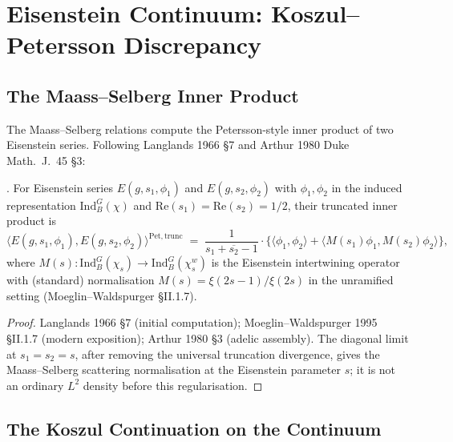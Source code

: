 \section{Eisenstein Continuum: Koszul--Petersson Discrepancy}
\label{v4-arith:kms-gns:cycle4}

\subsection{The Maass--Selberg Inner Product}
\label{v4-arith:kms-gns:cycle4:maass-selberg}

The Maass--Selberg relations compute the Petersson-style inner
product of two Eisenstein series. Following Langlands 1966 \S7 and
Arthur 1980 Duke Math.~J.~45 \S3:

\begin{lemma}
\label{v4-arith:kms-gns:lem:maass-selberg}
\ClaimStatusProvedElsewhere. For Eisenstein series
\(E(g,s_{1},\phi_{1})\) and \(E(g,s_{2},\phi_{2})\) with
\(\phi_{1},\phi_{2}\) in the induced representation
\(\mathrm{Ind}_{B}^{G}(\chi)\) and \(\mathrm{Re}(s_{1})=\mathrm{Re}(s_{2})=1/2\),
their truncated inner product is
\begin{equation}
\label{v4-arith:kms-gns:eq:maass-selberg}
\bigl\langle E(g,s_{1},\phi_{1}),E(g,s_{2},\phi_{2})\bigr\rangle^{\mathrm{Pet},\mathrm{trunc}}\;=\;\frac{1}{s_{1}+\overline{s_{2}}-1}\cdot\bigl\{\bigl\langle\phi_{1},\phi_{2}\bigr\rangle+\bigl\langle M(s_{1})\phi_{1},M(s_{2})\phi_{2}\bigr\rangle\bigr\},
\end{equation}
where \(M(s)\colon\mathrm{Ind}_{B}^{G}(\chi_{s})\to\mathrm{Ind}_{B}^{G}(\chi_{s}^{w})\)
is the Eisenstein intertwining operator with (standard) normalisation
\(M(s)=\xi(2s-1)/\xi(2s)\) in the unramified setting (Moeglin--Waldspurger
\S II.1.7).
\end{lemma}

\begin{proof}
Langlands 1966 \S7 (initial computation); Moeglin--Waldspurger 1995
\S II.1.7 (modern exposition); Arthur 1980 \S3 (adelic assembly).
The diagonal limit at \(s_{1}=s_{2}=s\), after removing the universal
truncation divergence, gives the Maass--Selberg scattering
normalisation at the Eisenstein parameter \(s\); it is not an ordinary
\(L^{2}\) density before this regularisation.
\end{proof}

\subsection{The Koszul Continuation on the Continuum}
\label{v4-arith:kms-gns:cycle4:koszul-continuation}

